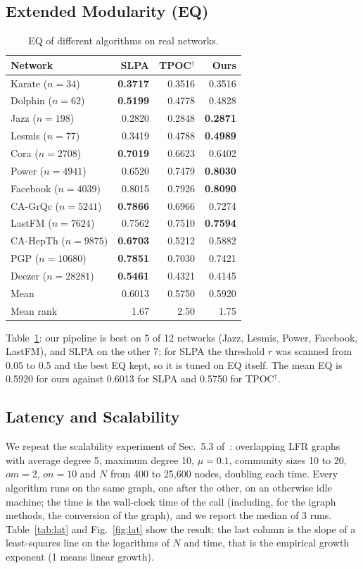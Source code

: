 \documentclass[conference]{IEEEtran}
\begin{document}
\subsection{Extended Modularity (EQ)}
\begin{table}[H]
\centering
\caption{EQ of different algorithms on real networks.}
\label{tab:eq}
\scriptsize
\begin{tabular}{lrrr}
\toprule
Network & SLPA & TPOC$^{\dagger}$ & Ours \\
\midrule
Karate ($n{=}34$) & \textbf{0.3717} & 0.3516 & 0.3516 \\
Dolphin ($n{=}62$) & \textbf{0.5199} & 0.4778 & 0.4828 \\
Jazz ($n{=}198$) & 0.2820 & 0.2848 & \textbf{0.2871} \\
Lesmis ($n{=}77$) & 0.3419 & 0.4788 & \textbf{0.4989} \\
Cora ($n{=}2708$) & \textbf{0.7019} & 0.6623 & 0.6402 \\
Power ($n{=}4941$) & 0.6520 & 0.7479 & \textbf{0.8030} \\
Facebook ($n{=}4039$) & 0.8015 & 0.7926 & \textbf{0.8090} \\
CA-GrQc ($n{=}5241$) & \textbf{0.7866} & 0.6966 & 0.7274 \\
LastFM ($n{=}7624$) & 0.7562 & 0.7510 & \textbf{0.7594} \\
CA-HepTh ($n{=}9875$) & \textbf{0.6703} & 0.5212 & 0.5882 \\
PGP ($n{=}10680$) & \textbf{0.7851} & 0.7030 & 0.7421 \\
Deezer ($n{=}28281$) & \textbf{0.5461} & 0.4321 & 0.4145 \\
\midrule
Mean & 0.6013 & 0.5750 & 0.5920 \\
Mean rank & 1.67 & 2.50 & 1.75 \\
\bottomrule
\end{tabular}
\end{table}
Table~\ref{tab:eq}: our pipeline is best on 5 of 12 networks (Jazz, Lesmis, Power, Facebook, LastFM), and SLPA on the other 7; for SLPA the threshold $r$ was scanned from 0.05 to 0.5 and the best EQ kept, so it is tuned on EQ itself. The mean EQ is 0.5920 for ours against 0.6013 for SLPA and 0.5750 for TPOC$^{\dagger}$.

\subsection{Latency and Scalability}\label{sec:latency}
We repeat the scalability experiment of Sec.~5.3 of~\cite{kong2026}: overlapping LFR graphs with average degree 5, maximum degree 10, $\mu{=}0.1$, community sizes 10 to 20, $om{=}2$, $on{=}10$ and $N$ from 400 to 25,600 nodes, doubling each time. Every algorithm runs on the same graph, one after the other, on an otherwise idle machine; the time is the wall-clock time of the call (including, for the igraph methods, the conversion of the graph), and we report the median of 3 runs. Table~\ref{tab:lat} and Fig.~\ref{fig:lat} show the result; the last column is the slope of a least-squares line on the logarithms of $N$ and time, that is the empirical growth exponent (1 means linear growth).
\end{document}
